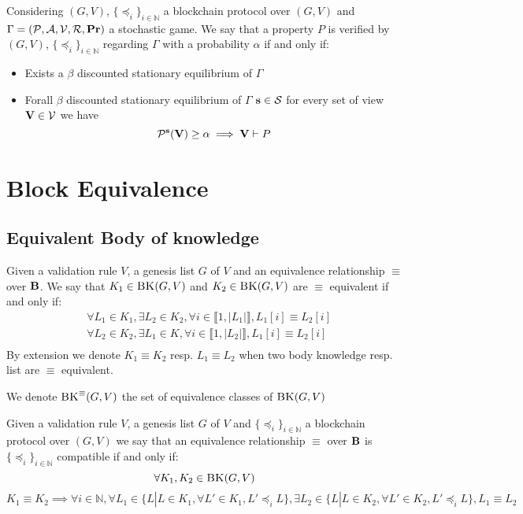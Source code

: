 \begin{mydef}
	Considering $(G,V)$, $\{ \preceq_i\}_{i \in \mathbb{N}}$ a blockchain protocol over $(G,V)$ and $\Gamma = (\mathcal{P},\mathcal{A},\mathcal{V},\mathcal{R},\mathbf{Pr})$ a stochastic game. We say that a property $P$ is verified by $(G,V)$, $\{ \preceq_i\}_{i \in \mathbb{N}}$ regarding $\Gamma$ with a probability $\alpha$ if and only if:
	\begin{itemize}
		\item Exists a $\beta$ discounted stationary equilibrium of $\Gamma$ \\
		\item Forall $\beta$ discounted stationary equilibrium of $\Gamma$ $\mathbf{s} \in \mathcal{S} $ for every set of view $\mathbf{V} \in \mathcal{V}$ we have $$\mathcal{P}^{\mathbf{s}}(\mathbf{V}) \geq \alpha \implies \mathbf{V} \vdash  P $$ 
	\end{itemize}
\end{mydef}


\section{Block Equivalence}

\subsection{Equivalent Body of knowledge}

\begin{mydef}
	Given a validation rule $V$, a genesis list $G$ of $V$ and an equivalence relationship $\equiv$ over $\text{\bf B}$. We say that $K_1 \in \text{\sc BK}(G,V)$ and $K_2 \in \text{\sc BK}(G,V)$ are $\equiv$ equivalent if and only if:
	\begin{eqnarray*}
		& \forall L_1 \in K_1, \exists L_2 \in K_2, \forall i \in \llbracket 1,|L_1| \rrbracket, L_1[i] \equiv L_2[i] \\
		& \forall L_2 \in K_2, \exists L_1 \in K, \forall i \in \llbracket 1,|L_2| \rrbracket, L_1[i] \equiv L_2[i] \\
	\end{eqnarray*}	
	By extension we denote $K_1 \equiv K_2$ resp. $L_1 \equiv L_2$ when two body knowledge resp. list are $\equiv$ equivalent.
\end{mydef}
We denote $\text{\sc BK}^\equiv(G,V)$ the set of equivalence classes of $\text{\sc BK}(G,V)$


\begin{mydef}
	Given a validation rule $V$, a genesis list $G$ of $V$ and $\{ \preceq_i\}_{i \in \mathbb{N}}$ a blockchain protocol over $(G,V)$ we say that an equivalence relationship $\equiv$ over $\text{\bf B}$ is $\{ \preceq_i\}_{i \in \mathbb{N}}$ compatible if and only if:
	$$\forall K_1 , K_2 \in \text{\sc BK}(G,V)$$
	$$K_1 \equiv K_2 \implies \forall i \in \mathbb{N}, \forall L_1 \in \{L | L \in K_1, \forall L' \in K_1, L' \preceq_i L \}, \exists L_2 \in \{L | L \in K_2, \forall L' \in K_2, L' \preceq_i L \}, L_1 \equiv L_2$$
\end{mydef}



